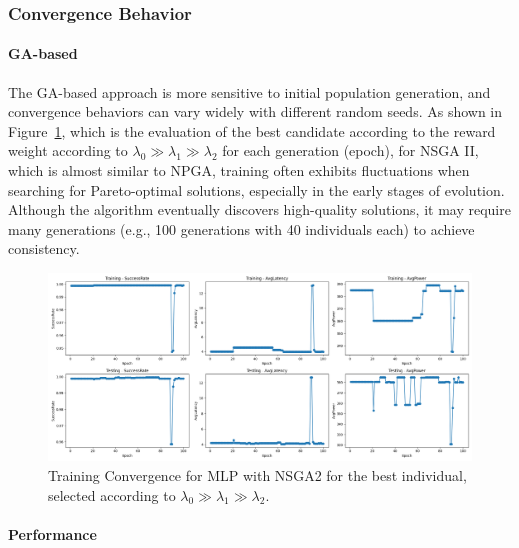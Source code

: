 \documentclass[preprint,3p,authoryear]{elsarticle}
\begin{document}
\subsubsection{Convergence Behavior}
\paragraph{GA-based}
The GA-based approach is more sensitive to initial population generation, and convergence behaviors can vary widely with different random seeds. As shown in Figure~\ref{fig:nsga2-mlp-training-epoch}, which is the evaluation of the best candidate according to the reward weight according to \(\lambda_0 \gg \lambda_1 \gg \lambda_2\) for each generation (epoch),  for NSGA II, which is almost similar to NPGA, training often exhibits fluctuations when searching for Pareto-optimal solutions, especially in the early stages of evolution. Although the algorithm eventually discovers high-quality solutions, it may require many generations (e.g., 100 generations with 40 individuals each) to achieve consistency.

\begin{figure}[H]
    \centering
    \includegraphics[width=0.95\linewidth]{figs/nsga2_mlp_training_epoch.png}
    \caption{Training Convergence for MLP with NSGA2 for the best individual, selected according to \(\lambda_0 \gg \lambda_1 \gg \lambda_2\).}  
    \label{fig:nsga2-mlp-training-epoch}  
\end{figure}



\paragraph{Performance}
\end{document}
